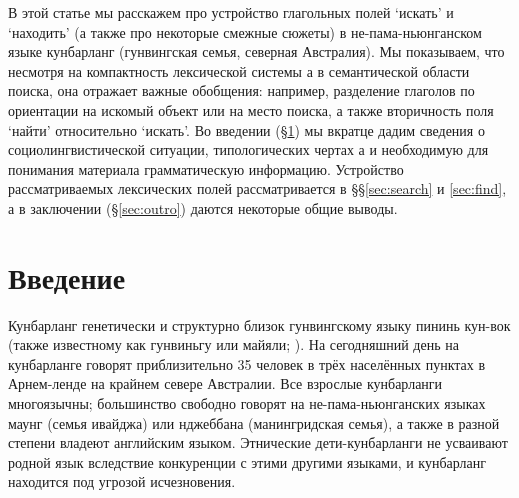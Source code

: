 
В этой статье мы расскажем про устройство глагольных полей `искать' и `находить' (а также про некоторые смежные сюжеты) в не-пама-ньюнганском языке кунбарланг (гунвингская семья, северная Австралия). Мы показываем, что несмотря на компактность лексической системы  а в семантической области поиска, она отражает важные обобщения: например, разделение глаголов по ориентации на искомый объект или на место поиска, а также вторичность поля `найти' относительно `искать'. Во введении (\S\ref{sec:intro}) мы вкратце дадим сведения о социолингвистической ситуации, типологических чертах  а и необходимую для понимания материала грамматическую информацию. Устройство рассматриваемых лексических полей рассматривается в \S\S\ref{sec:search} и \ref{sec:find}, а в заключении (\S\ref{sec:outro}) даются некоторые общие выводы.

\section{Введение}
\label{sec:intro}
Кунбарланг генетически и структурно близок гунвингскому языку пининь кун-вок (также известному как гунвиньгу или майяли; \cite{bgw}). На сегодняшний день на кунбарланге говорят приблизительно 35 человек в трёх населённых пунктах в Арнем-ленде на крайнем севере Австралии. Все взрослые кунбарланги многоязычны; большинство свободно говорят на не-пама-ньюнганских языках маунг (семья ивайджа) или нджеббана (манингридская семья), а также в разной степени владеют английским языком. Этнические дети-кунбарланги не усваивают родной язык вследствие конкуренции с этими другими языками, и кунбарланг находится под угрозой исчезновения.

